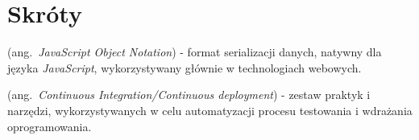 \chapter*{Skróty}\mbox{}
\label{sec:skroty}
\noindent
\begin{description}[labelwidth=*]
  \item [JSON] (ang.\ \emph{JavaScript Object Notation}) %
      - format serializacji danych, natywny dla języka \mbox{\textit{JavaScript}},
      wykorzystywany głównie w technologiach webowych.
  \item [CI/CD] (ang.\ \emph{Continuous Integration/Continuous deployment})
      - zestaw praktyk i narzędzi, wykorzystywanych w celu automatyzacji procesu
      testowania i wdrażania oprogramowania.
\end{description}
